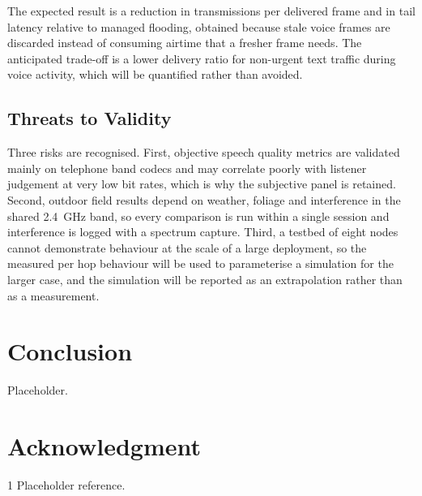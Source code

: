 \documentclass[a4paper,10pt]{article}
\begin{document}
The expected result is a reduction in transmissions per delivered
frame and in tail latency relative to managed flooding, obtained
because stale voice frames are discarded instead of consuming airtime
that a fresher frame needs. The anticipated trade-off is a lower
delivery ratio for non-urgent text traffic during voice activity,
which will be quantified rather than avoided.

\subsection{Threats to Validity}

Three risks are recognised. First, objective speech quality metrics
are validated mainly on telephone band codecs and may correlate poorly
with listener judgement at very low bit rates, which is why the
subjective panel is retained. Second, outdoor field results depend on
weather, foliage and interference in the shared 2.4~GHz band, so every
comparison is run within a single session and interference is logged
with a spectrum capture. Third, a testbed of eight nodes cannot
demonstrate behaviour at the scale of a large deployment, so the
measured per hop behaviour will be used to parameterise a simulation
for the larger case, and the simulation will be reported as an
extrapolation rather than as a measurement.

\section{Conclusion}
Placeholder.

\section*{Acknowledgment}

\begin{thebibliography}{1}
Placeholder reference.
\end{thebibliography}
\end{document}
